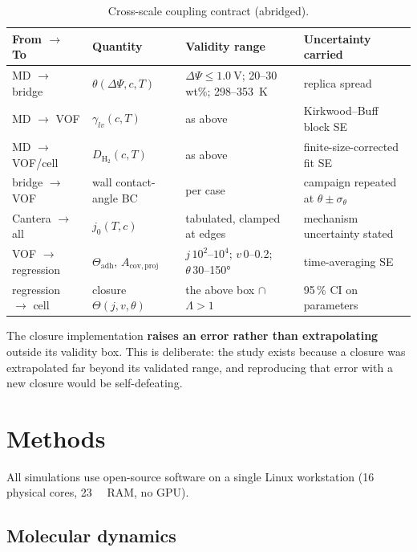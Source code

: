 \documentclass[11pt,a4paper]{article}
\begin{document}
\begin{table}[htbp]\centering\small
\caption{Cross-scale coupling contract (abridged).}
\label{tab:coupling}
\begin{tabular}{@{}llll@{}}
\toprule
From $\rightarrow$ To & Quantity & Validity range & Uncertainty carried \\
\midrule
MD $\rightarrow$ bridge & $\theta(\Delta\Psi,c,T)$ & $\Delta\Psi\le\SI{1.0}{\volt}$; 20--30\,wt\%; 298--\SI{353}{\kelvin} & replica spread \\
MD $\rightarrow$ VOF & $\gamma_{lv}(c,T)$ & as above & Kirkwood--Buff block SE \\
MD $\rightarrow$ VOF/cell & $D_{\mathrm{H_2}}(c,T)$ & as above & finite-size-corrected fit SE \\
bridge $\rightarrow$ VOF & wall contact-angle BC & per case & campaign repeated at $\theta\pm\sigma_\theta$ \\
Cantera $\rightarrow$ all & $j_0(T,c)$ & tabulated, clamped at edges & mechanism uncertainty stated \\
VOF $\rightarrow$ regression & $\Theta_{\mathrm{adh}}$, $A_{\mathrm{cov,proj}}$ & $j\,10^2$--$10^4$; $v\,0$--0.2; $\theta\,30$--\ang{150} & time-averaging SE \\
regression $\rightarrow$ cell & closure $\Theta(j,v,\theta)$ & the above box $\cap$ $\Lambda>1$ & 95\,\% CI on parameters \\
\bottomrule
\end{tabular}
\end{table}

The closure implementation \textbf{raises an error rather than extrapolating} outside its validity
box. This is deliberate: the study exists because a closure was extrapolated far beyond its
validated range, and reproducing that error with a new closure would be self-defeating.

\section{Methods}\label{sec:methods}

All simulations use open-source software on a single Linux workstation (16 physical cores,
\SI{23}{\giga\byte} RAM, no GPU).

\subsection{Molecular dynamics}
\end{document}
